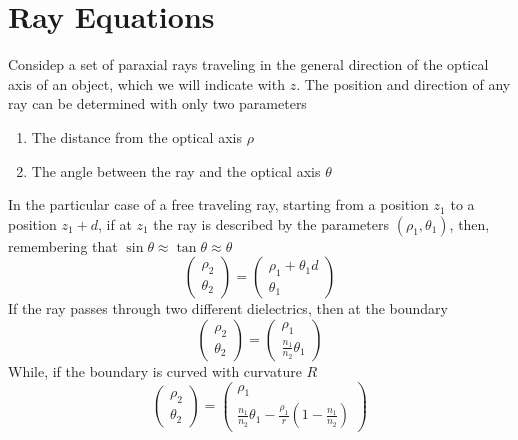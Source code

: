 \documentclass[../electromagnetism.tex]{subfiles}
\begin{document}
\section{Ray Equations}
Considep a set of paraxial rays traveling in the general direction of the optical axis of an object, which we will indicate with $z$. The position and direction of any ray can be determined with only two parameters
\begin{enumerate}
\item The distance from the optical axis $\rho$
\item The angle between the ray and the optical axis $\theta$
\end{enumerate}
In the particular case of a free traveling ray, starting from a position $z_1$ to a position $z_1+d$, if at $z_1$ the ray is described by the parameters $(\rho_1,\theta_1)$, then, remembering that $\sin\theta\approx\tan\theta\approx\theta$
\begin{equation}
	\begin{pmatrix}
		\rho_2\\
		\theta_2
	\end{pmatrix}=\begin{pmatrix}
		\rho_1+\theta_1d\\
		\theta_1
	\end{pmatrix}
	\label{eq:freetravel.ray}
\end{equation}
If the ray passes through two different dielectrics, then at the boundary
\begin{equation}
	\begin{pmatrix}
		\rho_2\\
		\theta_2
	\end{pmatrix}=\begin{pmatrix}
		\rho_1\\
		\frac{n_1}{n_2}\theta_1
	\end{pmatrix}
	\label{eq:boundary-flat.ray}
\end{equation}
While, if the boundary is curved with curvature $R$
\begin{equation}
	\begin{pmatrix}
		\rho_2\\
		\theta_2
	\end{pmatrix}=\begin{pmatrix}
		\rho_1\\
		\frac{n_1}{n_2}\theta_1-\frac{\rho_1}{r}\left( 1-\frac{n_1}{n_2} \right)
	\end{pmatrix}
	\label{eq:boundary-curved.ray}
\end{equation}
\end{document}
